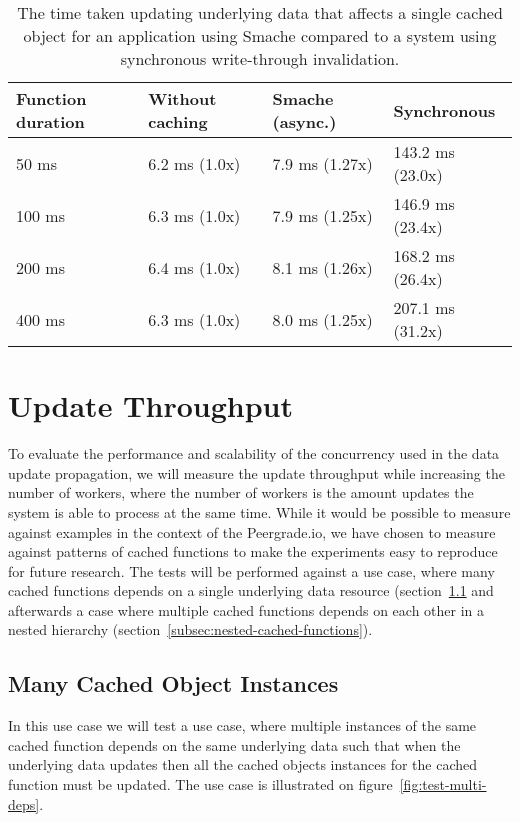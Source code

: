 \begin{table}[ht!]
  \centering
  \begin{tabular}{llll}
    \hline
    Function duration & Without caching & Smache (async.) & Synchronous \\
    \hline
    50 ms  & 6.2 ms (1.0x)  & 7.9 ms (1.27x)  &  143.2 ms (23.0x) \\
    100 ms & 6.3 ms (1.0x)  & 7.9 ms (1.25x)  &  146.9 ms (23.4x) \\
    200 ms & 6.4 ms (1.0x)  & 8.1 ms (1.26x)  &  168.2 ms (26.4x) \\
    400 ms & 6.3 ms (1.0x)  & 8.0 ms (1.25x)  &  207.1 ms (31.2x) \\
    \hline
  \end{tabular}
  \caption{The time taken updating underlying data that affects a single cached object for an application using Smache compared to a system using synchronous write-through invalidation.}
  \label{tab:update-requests}
\end{table}


\section{Update Throughput}
\label{sec:update-throughput}

To evaluate the performance and scalability of the concurrency used in the data update propagation, we will measure the update throughput while increasing the number of workers, where the number of workers is the amount updates the system is able to process at the same time. While it would be possible to measure against examples in the context of the Peergrade.io, we have chosen to measure against patterns of cached functions to make the experiments easy to reproduce for future research. The tests will be performed against a use case, where many cached functions depends on a single underlying data resource (section~\ref{subsec:many-cached-object-instances} and afterwards a case where multiple cached functions depends on each other in a nested hierarchy (section~\ref{subsec:nested-cached-functions}).

\subsection{Many Cached Object Instances}
\label{subsec:many-cached-object-instances}

In this use case we will test a use case, where multiple instances of the same cached function depends on the same underlying data such that when the underlying data updates then all the cached objects instances for the cached function must be updated. The use case is illustrated on figure~\ref{fig:test-multi-deps}.

